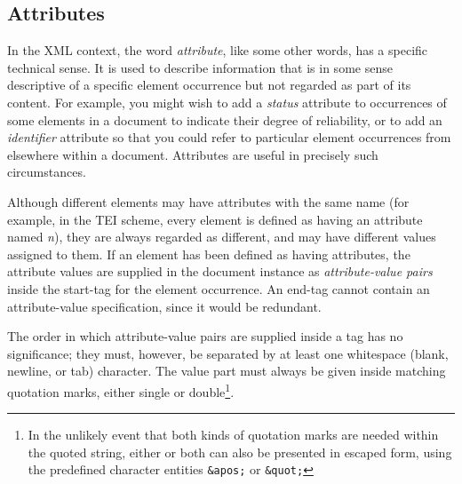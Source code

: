 \subsection[{Attributes}]{Attributes}\label{SG16}\par
In the XML context, the word \textit{attribute}, like some other words, has a specific technical sense. It is used to describe information that is in some sense descriptive of a specific element occurrence but not regarded as part of its content. For example, you might wish to add a {\itshape status} attribute to occurrences of some elements in a document to indicate their degree of reliability, or to add an {\itshape identifier} attribute so that you could refer to particular element occurrences from elsewhere within a document. Attributes are useful in precisely such circumstances.\par
Although different elements may have attributes with the same name (for example, in the TEI scheme, every element is defined as having an attribute named {\itshape n}), they are always regarded as different, and may have different values assigned to them. If an element has been defined as having attributes, the attribute values are supplied in the document instance as \textit{attribute-value pairs} inside the start-tag for the element occurrence. An end-tag cannot contain an attribute-value specification, since it would be redundant.\par
The order in which attribute-value pairs are supplied inside a tag has no significance; they must, however, be separated by at least one whitespace (blank, newline, or tab) character. The value part must always be given inside matching quotation marks, either single or double\footnote{In the unlikely event that both kinds of quotation marks are needed within the quoted string, either or both can also be presented in escaped form, using the predefined character entities \texttt{\&apos;} or \texttt{\&quot;}}.\par
